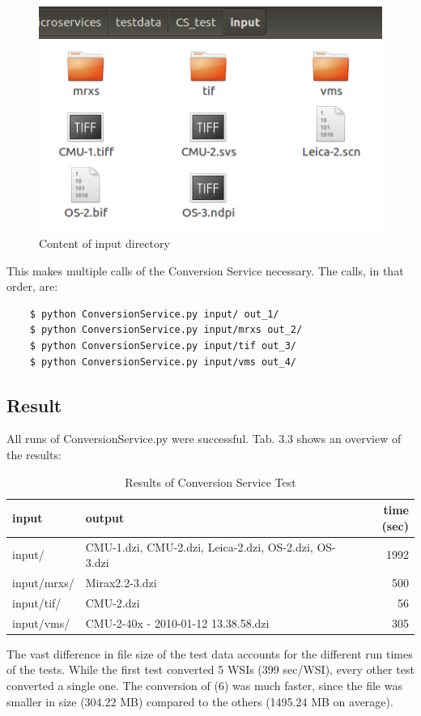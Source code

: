 \begin{figure}[H]
	\begin{center}
		\includegraphics[scale=0.5]{img/inputDir.png}
		\caption{Content of input directory}
		\label{fig:fig3.2}
	\end{center}
\end{figure}

This makes multiple calls of the Conversion Service necessary. The calls, in that order, are:

\begin{lstlisting}
	$ python ConversionService.py input/ out_1/
	$ python ConversionService.py input/mrxs out_2/
	$ python ConversionService.py input/tif out_3/
	$ python ConversionService.py input/vms out_4/
\end{lstlisting}


\subsection{Result}

All runs of ConversionService.py were successful. Tab. 3.3 shows an overview of the results:

\begin{table}[H]
	\begin{center}
		\begin{tabular}{| l | l | r |}
			\hline
			\textbf{input} & \textbf{output} & \textbf{time (sec)} \\ \hline
			input/ & CMU-1.dzi, CMU-2.dzi, Leica-2.dzi, OS-2.dzi, OS-3.dzi & 1992 \\ \hline
			input/mrxs/ & Mirax2.2-3.dzi & 500 \\ \hline
			input/tif/ & CMU-2.dzi & 56 \\ \hline
			input/vms/ & CMU-2-40x - 2010-01-12 13.38.58.dzi & 305 \\ \hline
		\end{tabular}
		\caption{Results of Conversion Service Test}
	\end{center}
\end{table}

The vast difference in file size of the test data accounts for the different run times of the tests. While the first test converted 5 WSIs (399 sec/WSI), every other test converted a single one. The conversion of (6) was much faster, since the file was smaller in size (304.22 MB) compared to the others (1495.24 MB on average).